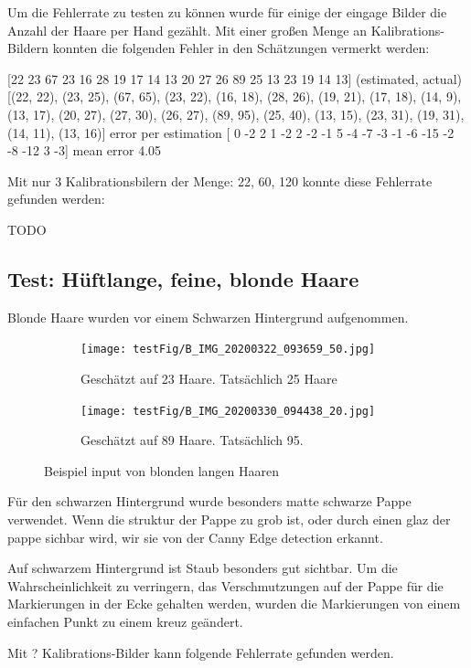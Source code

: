 \documentclass[german,a4paper,12pt,smallheadings,headsepline, titlepage, liststotoc, idextotoc,bibtoctoc,blibliography = totocnumbered]{scrartcl}
\begin{document}
Um die Fehlerrate zu testen zu können wurde für einige der eingage Bilder die Anzahl der Haare per Hand gezählt.
Mit einer großen Menge an Kalibrations-Bildern konnten die folgenden Fehler in den Schätzungen vermerkt werden:
 
[22 23 67 23 16 28 19 17 14 13 20 27 26 89 25 13 23 19 14 13]
(estimated, actual)
[(22, 22), (23, 25), (67, 65), (23, 22), (16, 18), (28, 26), (19, 21), (17, 18), (14, 9), (13, 17), (20, 27), (27, 30), (26, 27), (89, 95), (25, 40), (13, 15), (23, 31), (19, 31), (14, 11), (13, 16)]
error per estimation [  0  -2   2   1  -2   2  -2  -1   5  -4  -7  -3  -1  -6 -15  -2  -8 -12 3  -3]
mean error 4.05

Mit nur 3 Kalibrationsbilern der Menge: 22, 60, 120 konnte diese Fehlerrate gefunden werden:

TODO

\subsection{Test: Hüftlange, feine, blonde Haare}

Blonde Haare wurden vor einem Schwarzen Hintergrund aufgenommen. 

\begin{figure}
	\centering
	\begin{subfigure}[b]{0.475\textwidth}
		\centering
		\texttt{[image: testFig/B\_IMG\_20200322\_093659\_50.jpg]}
		\caption[]{Geschätzt auf 23 Haare. Tatsächlich 25 Haare}
		\label{img:tstM1} 
	\end{subfigure}
	\hfill
	\begin{subfigure}[b]{0.475\textwidth} 
		\centering
		\texttt{[image: testFig/B\_IMG\_20200330\_094438\_20.jpg]}
		\caption[]{Geschätzt auf 89 Haare. Tatsächlich 95.}
		\label{img:tstM2}
	\end{subfigure}
	\caption[  ]
	{\small Beispiel input von blonden langen Haaren} 
	\label{img:tstM}
\end{figure}
Für den schwarzen Hintergrund wurde besonders matte schwarze Pappe verwendet. Wenn die struktur der Pappe zu grob ist, oder durch einen glaz der pappe sichbar wird, wir sie von der Canny Edge detection erkannt. 

Auf schwarzem Hintergrund ist Staub besonders gut sichtbar. Um die Wahrscheinlichkeit zu verringern, das Verschmutzungen auf der Pappe für die Markierungen in der Ecke gehalten werden, wurden die Markierungen von einem einfachen Punkt zu einem kreuz geändert.  

Mit ? Kalibrations-Bilder kann folgende Fehlerrate gefunden werden.
\end{document}
